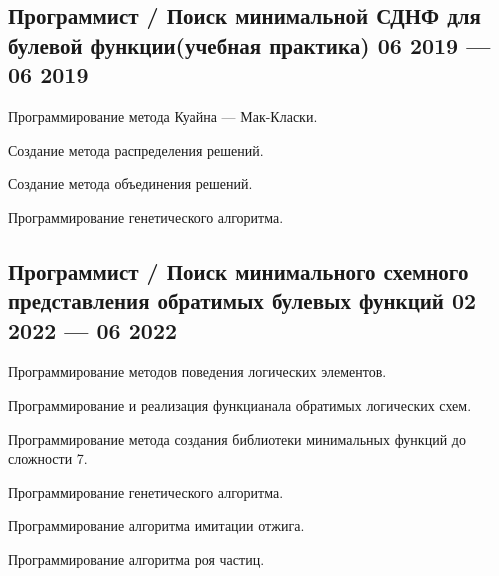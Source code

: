 \subsection{{Программист / Поиск минимальной СДНФ для булевой функции(учебная практика) \hfill 06 2019 --- 06 2019}}
\begin{zitemize}
\item Программирование метода Куайна — Мак-Класки.
\item Создание метода распределения решений.
\item Создание метода объединения решений.
\item Программирование генетического алгоритма.
\end{zitemize}

\subsection{{Программист / Поиск минимального схемного представления обратимых булевых функций \hfill 02 2022 --- 06 2022}}
\begin{zitemize}
\item Программирование методов поведения логических элементов.
\item Программирование и реализация функцианала обратимых логических схем.
\item Программирование метода создания библиотеки минимальных функций до сложности 7.
\item Программирование генетического алгоритма.
\item Программирование алгоритма имитации отжига.
\item Программирование алгоритма роя частиц.
\end{zitemize}


